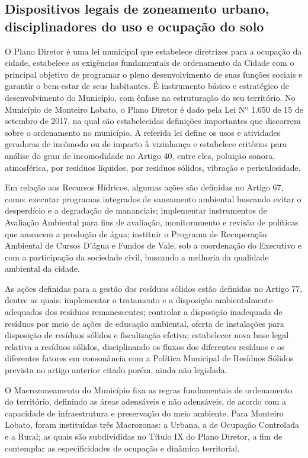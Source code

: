 \subsection{Dispositivos legais de zoneamento urbano, disciplinadores do uso e ocupação do solo}
O Plano Diretor é uma lei municipal que estabelece diretrizes para a ocupação da cidade, estabelece as exigências fundamentais de ordenamento da Cidade com o principal objetivo de programar o pleno desenvolvimento de suas funções sociais e garantir o bem-estar de seus habitantes. É instrumento básico e estratégico de desenvolvimento do Município, com ênfase na estruturação do seu território.
No Município de Monteiro Lobato, o Plano Diretor é dado pela Lei Nº 1.650 de 15 de setembro de 2017, na qual são estabelecidas definições importantes que discorrem sobre o ordenamento no município. A referida lei define os usos e atividades geradoras de incômodo ou de impacto à vizinhança e estabelece critérios para análise do grau de incomodidade no Artigo 40, entre eles, poluição sonora, atmosférica, por resíduos líquidos, por resíduos sólidos, vibração e periculosidade.

Em relação aos Recursos Hídricos, algumas ações são definidas no Artigo 67, como: executar programas integrados de saneamento ambiental buscando evitar o desperdício e a degradação de mananciais; implementar instrumentos de Avaliação Ambiental para fins de avaliação, monitoramento e revisão de políticas que ameacem a produção de água; instituir o Programa de Recuperação Ambiental de Cursos D’água e Fundos de Vale, sob a coordenação do Executivo e com a participação da sociedade civil, buscando a melhoria da qualidade ambiental da cidade.

As ações definidas para a gestão dos resíduos sólidos estão definidas no Artigo 77, dentre as quais: implementar o tratamento e a disposição ambientalmente adequados dos resíduos remanescentes; controlar a disposição inadequada de resíduos por meio de ações de educação ambiental, oferta de instalações para disposição de resíduos sólidos e fiscalização efetiva; estabelecer nova base legal relativa a resíduos sólidos, disciplinando os fluxos dos diferentes resíduos e os diferentes fatores em consonância com a Política Municipal de Resíduos Sólidos prevista no artigo anterior citado porém, ainda não  legislada.

O Macrozoneamento do Município fixa as regras fundamentais de ordenamento do território, definindo as áreas adensáveis e não adensáveis, de acordo com a capacidade de infraestrutura e preservação do meio ambiente. Para Monteiro Lobato, foram instituídas três Macrozonas: a Urbana, a de Ocupação Controlada e a Rural; as quais são subdivididas no Título IX do Plano Diretor, a fim de contemplar as especificidades de ocupação e dinâmica territorial.

